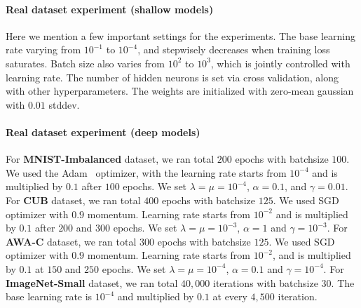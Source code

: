 \documentclass{article}
\begin{document}
		\vspace{-0.1in}
		\paragraph {Real dataset experiment (shallow models)}
		Here we mention a few important settings for the experiments. The base learning rate varying from $10^{-1}$ to $10^{-4}$, and stepwisely decreases when training loss saturates. Batch size also varies from $10^2$ to $10^3$, which is jointly controlled with learning rate. The number of hidden neurons is set via cross validation, along with other hyperparameters. The weights are initialized with zero-mean gaussian with $0.01$ stddev.
		
		\vspace{-0.1in}
		\paragraph {Real dataset experiment (deep models)}
		For \textbf{MNIST-Imbalanced} dataset, we ran total $200$ epochs with batchsize $100$. We used the Adam~\cite{adam} optimizer, with the learning rate starts from $10^{-4}$ and is multiplied by $0.1$ after $100$ epochs. We set $\lambda = \mu = 10^{-4}$, $\alpha=0.1$, and $\gamma=0.01$.
		For \textbf{CUB} dataset, we ran total $400$ epochs with batchsize $125$. We used SGD optimizer with $0.9$ momentum. Learning rate starts from $10^{-2}$ and is multiplied by $0.1$ after $200$ and $300$ epochs. We set $\lambda = \mu = 10^{-3}$, $\alpha=1$ and $\gamma=10^{-3}$.
		For \textbf{AWA-C} dataset, we ran total $300$ epochs with batchsize $125$. We used SGD
		optimizer with $0.9$ momentum. Learning rate starts from $10^{-2}$, and is multiplied by $0.1$ at $150$ and $250$ epochs. We set $\lambda = \mu = 10^{-4}$, $\alpha=0.1$ and $\gamma=10^{-4}$.
		For \textbf{ImageNet-Small} dataset, we ran total $40,000$ iterations with batchsize $30$. The base learning rate is $10^{-4}$ and multiplied by $0.1$ at every $4,500$ iteration. 

	
\end{document}
